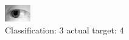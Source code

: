 \begin{figure}[h!]
\begin{center}
\includegraphics[width=0.60\columnwidth]{figures/ID1246_class_3_target_4.png}
\end{center}
\caption{ Classification: 3 actual target: 4}
\label{fig:ID1246_class_3_target_4}
\end{figure}
